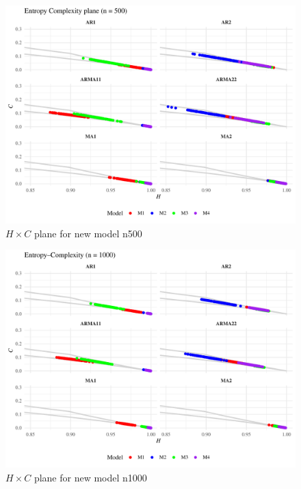 \documentclass[11pt,a4paper]{article}
\begin{document}
\begin{figure}[H]
	\includegraphics[width=0.9 \textwidth]{New_model_group_plot_n500}
	\caption{$H \times C$ plane for new model n500}
	\label{fig:HC new n500}
\end{figure}

\begin{figure}[H]
	\includegraphics[width=0.9 \textwidth]{New_model_group_plot_n1000}
	\caption{$H \times C$ plane for new model n1000}
	\label{fig:HC new n1000}
\end{figure}
\end{document}
